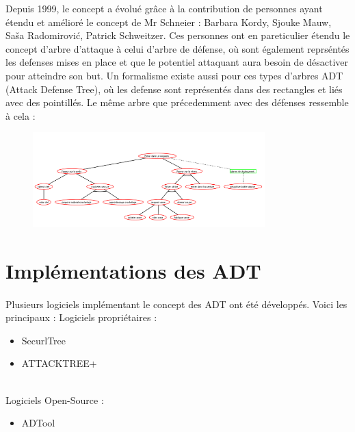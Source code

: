 		Depuis 1999, le concept a évolué grâce à la contribution de personnes ayant étendu et amélioré le concept de Mr Schneier : Barbara Kordy, Sjouke Mauw, Saša Radomirović, Patrick Schweitzer. Ces personnes ont en pareticulier étendu le concept d'arbre d'attaque à celui d'arbre de défense, où sont également reprséntés les defenses mises en place et que le potentiel attaquant aura besoin de désactiver pour atteindre son but. Un formalisme existe aussi pour ces types d'arbres ADT (Attack Defense Tree), où les defense sont représentés dans des rectangles et liés avec des pointillés. Le même arbre que précedemment avec des défenses ressemble à cela : 

		\begin{figure}
			\includegraphics[width=0.8\textwidth]{figure/Entrer_dans_un_magasin2.png}
		\end{figure}

	\section{Implémentations des ADT}
		\paragraph{}
		Plusieurs logiciels implémentant le concept des ADT ont été développés. Voici les principaux :
		\large Logiciels propriétaires :
		\begin{itemize}
			\item SecurlTree
			\item ATTACKTREE+
		\end{itemize}
		~~\\
		\large Logiciels Open-Source :
		\begin{itemize}
			\item ADTool
		\end{itemize}

